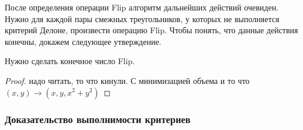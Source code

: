 После определения операции Flip алгоритм дальнейших действий очевиден. Нужно для каждой пары смежных треугольников, у которых не выполняется критерий Делоне, произвести операцию Flip. Чтобы понять, что данные действия конечны, докажем следующее утверждение.  

\begin{statement}
Нужно сделать конечное число Flip.
\begin{proof} 
надо читать, то что кинули. С минимизацией объема и то что $(x, y) \rightarrow (x, y, x^2 + y^2)$
\end{proof}
\end{statement}

\subsubsection[title]{Доказательство выполнимости критериев}

